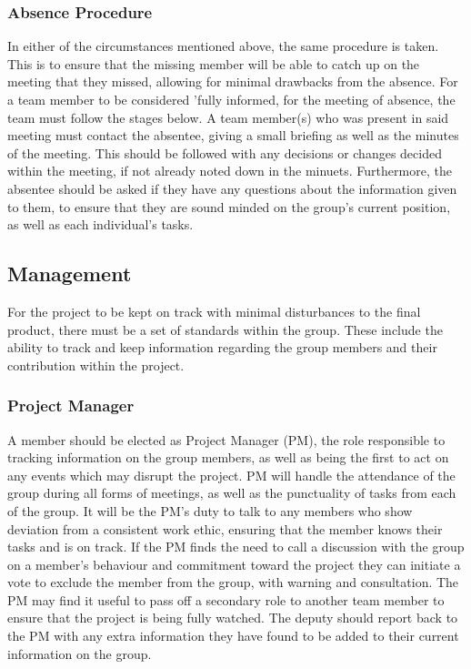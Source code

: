 \documentclass[11pt]{report}
\begin{document}
\subsubsection{Absence Procedure}
In either of the circumstances mentioned above, the same procedure is taken. This is to ensure that the missing member will be able to catch up on the meeting that they missed, allowing for minimal drawbacks from the absence. For a team member to be considered 'fully informed, for the meeting of absence, the team must follow the stages below.
A team member(s) who was present in said meeting must contact the absentee, giving a small briefing as well as the minutes of the meeting. This should be followed with any decisions or changes decided within the meeting,  if not already noted down in the minuets. Furthermore, the absentee should be asked if they have any questions about the information given to them, to ensure that they are sound minded on the group's current position, as well as each individual's tasks.

\subsection{Management}
For the project to be kept on track with minimal disturbances to the final product, there must be a set of standards within the group. These include the ability to track and keep information regarding the group members and their contribution within the project.

\subsubsection{Project Manager}
A member should be elected as Project Manager (PM), the role responsible to tracking information on the group members, as well as being the first to act on any events which may disrupt the project. PM will handle the attendance of the group during all forms of meetings, as well as the punctuality of tasks from each of the group. It will be the PM's duty to talk to any members who show deviation from a consistent work ethic, ensuring that the member knows their tasks and is on track. If the PM finds the need to call a discussion with the group on a member's behaviour and commitment toward the project they can initiate a vote to exclude the member from the group, with warning and consultation.
The PM may find it useful to pass off a secondary role to another team member to ensure that the project is being fully watched. The deputy should report back to the PM with any extra information they have found to be added to their current information on the group.
\end{document}

